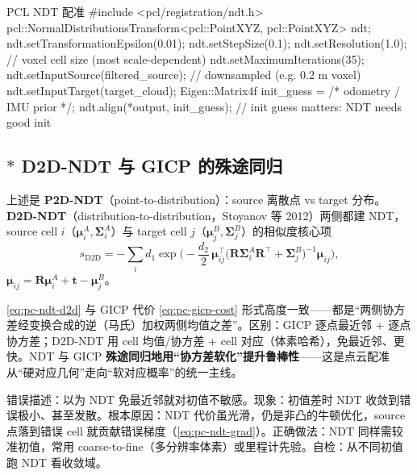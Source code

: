 \begin{codebox}[C++]{PCL NDT 配准}
#include <pcl/registration/ndt.h>
pcl::NormalDistributionsTransform<pcl::PointXYZ, pcl::PointXYZ> ndt;
ndt.setTransformationEpsilon(0.01);
ndt.setStepSize(0.1);
ndt.setResolution(1.0);          // voxel cell size (most scale-dependent)
ndt.setMaximumIterations(35);
ndt.setInputSource(filtered_source);   // downsampled (e.g. 0.2 m voxel)
ndt.setInputTarget(target_cloud);
Eigen::Matrix4f init_guess = /* odometry / IMU prior */;
ndt.align(*output, init_guess);  // init guess matters: NDT needs good init
\end{codebox}

\subsection{$*$ D2D-NDT 与 GICP 的殊途同归}
\label{sec:pc-ndt-d2d}

上述是 \textbf{P2D-NDT}（point-to-distribution）：source 离散点 vs target 分布。\textbf{D2D-NDT}（distribution-to-distribution，Stoyanov 等 2012）两侧都建 NDT，source cell $i$（$\boldsymbol{\mu}_i^A,\boldsymbol{\Sigma}_i^A$）与 target cell $j$（$\boldsymbol{\mu}_j^B,\boldsymbol{\Sigma}_j^B$）的相似度核心项
\begin{equation}
  s_{\text{D2D}}=-\sum_{i}d_1\exp\!\Big(-\frac{d_2}{2}\,\boldsymbol{\mu}_{ij}^\top\big(\mathbf{R}\boldsymbol{\Sigma}_i^A\mathbf{R}^\top+\boldsymbol{\Sigma}_j^B\big)^{-1}\boldsymbol{\mu}_{ij}\Big),
  \label{eq:pc-ndt-d2d}
\end{equation}
$\boldsymbol{\mu}_{ij}=\mathbf{R}\boldsymbol{\mu}_i^A+\mathbf{t}-\boldsymbol{\mu}_j^B$。

\begin{insight}
\cref{eq:pc-ndt-d2d} 与 GICP 代价 \cref{eq:pc-gicp-cost} 形式高度一致——都是“两侧协方差经变换合成的逆（马氏）加权两侧均值之差”。区别：GICP 逐点最近邻 + 逐点协方差；D2D-NDT 用 cell 均值/协方差 + cell 对应（体素哈希），免最近邻、更快。NDT 与 GICP \textbf{殊途同归地用“协方差软化”提升鲁棒性}——这是点云配准从“硬对应几何”走向“软对应概率”的统一主线。
\end{insight}

\begin{pitfall}
错误描述：以为 NDT 免最近邻就对初值不敏感。现象：初值差时 NDT 收敛到错误极小、甚至发散。根本原因：NDT 代价虽光滑，仍是非凸的牛顿优化，source 点落到错误 cell 就贡献错误梯度（\cref{eq:pc-ndt-grad}）。正确做法：NDT 同样需较准初值，常用 coarse-to-fine（多分辨率体素）或里程计先验。自检：从不同初值跑 NDT 看收敛域。
\end{pitfall}


